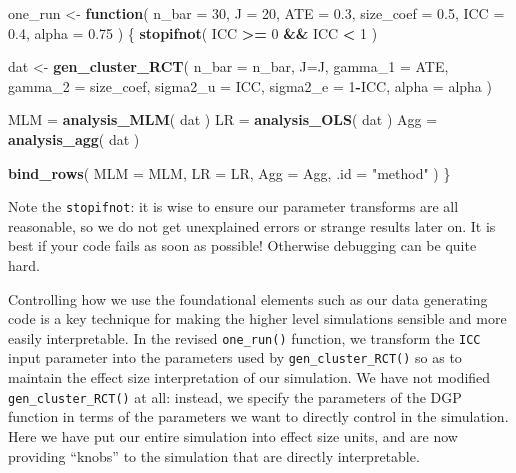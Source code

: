 \documentclass[
]{book}
\newenvironment{Shaded}{\begin{snugshade}}{\end{snugshade}}
\newcommand{\AttributeTok}[1]{\textcolor[rgb]{0.13,0.29,0.53}{#1}}
\newcommand{\ControlFlowTok}[1]{\textcolor[rgb]{0.13,0.29,0.53}{\textbf{#1}}}
\newcommand{\DecValTok}[1]{\textcolor[rgb]{0.00,0.00,0.81}{#1}}
\newcommand{\FloatTok}[1]{\textcolor[rgb]{0.00,0.00,0.81}{#1}}
\newcommand{\FunctionTok}[1]{\textcolor[rgb]{0.13,0.29,0.53}{\textbf{#1}}}
\newcommand{\NormalTok}[1]{#1}
\newcommand{\OtherTok}[1]{\textcolor[rgb]{0.56,0.35,0.01}{#1}}
\newcommand{\SpecialCharTok}[1]{\textcolor[rgb]{0.81,0.36,0.00}{\textbf{#1}}}
\newcommand{\StringTok}[1]{\textcolor[rgb]{0.31,0.60,0.02}{#1}}
\begin{document}
\begin{Shaded}
\begin{Highlighting}[]
\NormalTok{one\_run }\OtherTok{\textless{}{-}} \ControlFlowTok{function}\NormalTok{( }
  \AttributeTok{n\_bar =} \DecValTok{30}\NormalTok{, }\AttributeTok{J =} \DecValTok{20}\NormalTok{, }\AttributeTok{ATE =} \FloatTok{0.3}\NormalTok{, }\AttributeTok{size\_coef =} \FloatTok{0.5}\NormalTok{,}
  \AttributeTok{ICC =} \FloatTok{0.4}\NormalTok{, }\AttributeTok{alpha =} \FloatTok{0.75} 
\NormalTok{) \{}
  \FunctionTok{stopifnot}\NormalTok{( ICC }\SpecialCharTok{\textgreater{}=} \DecValTok{0} \SpecialCharTok{\&\&}\NormalTok{ ICC }\SpecialCharTok{\textless{}} \DecValTok{1}\NormalTok{ )}

\NormalTok{  dat }\OtherTok{\textless{}{-}} \FunctionTok{gen\_cluster\_RCT}\NormalTok{( }
    \AttributeTok{n\_bar =}\NormalTok{ n\_bar, }\AttributeTok{J=}\NormalTok{J, }\AttributeTok{gamma\_1 =}\NormalTok{ ATE, }\AttributeTok{gamma\_2 =}\NormalTok{ size\_coef,}
    \AttributeTok{sigma2\_u =}\NormalTok{ ICC, }\AttributeTok{sigma2\_e =} \DecValTok{1}\SpecialCharTok{{-}}\NormalTok{ICC, }\AttributeTok{alpha =}\NormalTok{ alpha }
\NormalTok{  )}
  
\NormalTok{  MLM }\OtherTok{=} \FunctionTok{analysis\_MLM}\NormalTok{( dat )}
\NormalTok{  LR }\OtherTok{=} \FunctionTok{analysis\_OLS}\NormalTok{( dat )}
\NormalTok{  Agg }\OtherTok{=} \FunctionTok{analysis\_agg}\NormalTok{( dat )}
  
  \FunctionTok{bind\_rows}\NormalTok{( }\AttributeTok{MLM =}\NormalTok{ MLM, }\AttributeTok{LR =}\NormalTok{ LR, }\AttributeTok{Agg =}\NormalTok{ Agg, }\AttributeTok{.id =} \StringTok{"method"}\NormalTok{ )}
\NormalTok{\}}
\end{Highlighting}
\end{Shaded}

Note the \texttt{stopifnot}: it is wise to ensure our parameter transforms are all reasonable, so we do not get unexplained errors or strange results later on.
It is best if your code fails as soon as possible! Otherwise debugging can be quite hard.

Controlling how we use the foundational elements such as our data generating code is a key technique for making the higher level simulations sensible and more easily interpretable.
In the revised \texttt{one\_run()} function, we transform the \texttt{ICC} input parameter into the parameters used by \texttt{gen\_cluster\_RCT()} so as to maintain the effect size interpretation of our simulation.
We have not modified \texttt{gen\_cluster\_RCT()} at all: instead, we specify the parameters of the DGP function in terms of the parameters we want to directly control in the simulation.
Here we have put our entire simulation into effect size units, and are now providing ``knobs'' to the simulation that are directly interpretable.
\end{document}
